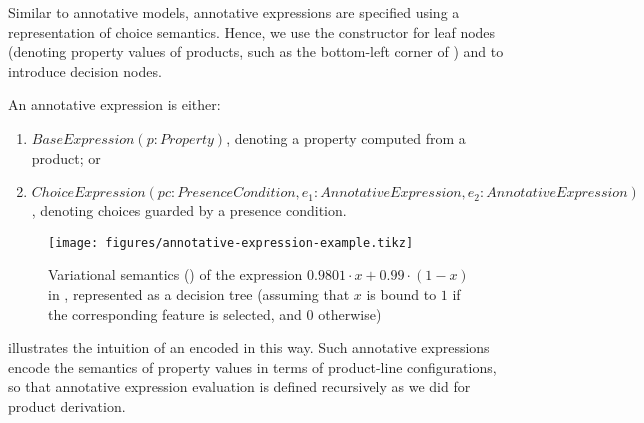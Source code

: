 Similar to annotative models, annotative expressions are specified using a representation of choice semantics.
Hence, we use the  constructor for leaf nodes
(denoting property values of products, such as the bottom-left corner of )
and  to introduce decision nodes.


\begin{definition}
\label{defn:annotative-expression}
An annotative expression is either:
\begin{enumerate}
    \item $\mathit{BaseExpression(p\!:Property)}$, denoting a property computed from a product; or
    \item $\mathit{ChoiceExpression(pc\!:PresenceCondition,e_1\!:AnnotativeExpression,e_2\!:AnnotativeExpression)}$, denoting choices guarded by a presence condition. 
\end{enumerate}
\end{definition} 

\begin{figure}[!htbp]
	\centering
    \texttt{[image: figures/annotative-expression-example.tikz]}
    \caption{Variational semantics () of the expression $0.9801\cdot x + 0.99\cdot(1-x)$ in , represented as a decision tree (assuming that $x$ is bound to $1$ if the corresponding feature is selected, and $0$ otherwise)}
	\label{fig:annotative-expression-example}
\end{figure}

 illustrates the intuition of an  encoded in this way.
Such annotative expressions encode the semantics of property values in terms of product-line configurations, so that annotative expression evaluation is defined recursively as we did for product derivation.%

